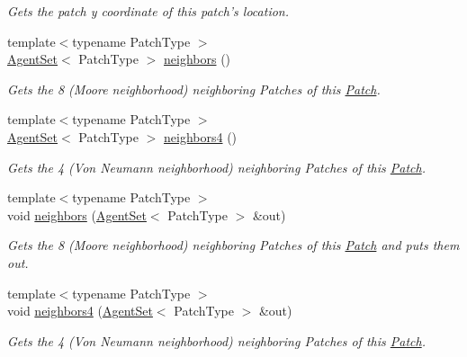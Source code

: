 \begin{DoxyCompactItemize}
\begin{DoxyCompactList}\small\item\em Gets the patch y coordinate of this patch's location. \end{DoxyCompactList}\item 
{\footnotesize template$<$typename Patch\-Type $>$ }\\\hyperlink{classrepast_1_1relogo_1_1_agent_set}{Agent\-Set}$<$ Patch\-Type $>$ \hyperlink{classrepast_1_1relogo_1_1_patch_a932368812cacb950454ceec64bf621e1}{neighbors} ()
\begin{DoxyCompactList}\small\item\em Gets the 8 (Moore neighborhood) neighboring Patches of this \hyperlink{classrepast_1_1relogo_1_1_patch}{Patch}. \end{DoxyCompactList}\item 
{\footnotesize template$<$typename Patch\-Type $>$ }\\\hyperlink{classrepast_1_1relogo_1_1_agent_set}{Agent\-Set}$<$ Patch\-Type $>$ \hyperlink{classrepast_1_1relogo_1_1_patch_a0e372725c27abb4e9b2b6ae61cfc4540}{neighbors4} ()
\begin{DoxyCompactList}\small\item\em Gets the 4 (Von Neumann neighborhood) neighboring Patches of this \hyperlink{classrepast_1_1relogo_1_1_patch}{Patch}. \end{DoxyCompactList}\item 
{\footnotesize template$<$typename Patch\-Type $>$ }\\void \hyperlink{classrepast_1_1relogo_1_1_patch_a23f5d9dbecd26acb74d71bd05c36ce77}{neighbors} (\hyperlink{classrepast_1_1relogo_1_1_agent_set}{Agent\-Set}$<$ Patch\-Type $>$ \&out)
\begin{DoxyCompactList}\small\item\em Gets the 8 (Moore neighborhood) neighboring Patches of this \hyperlink{classrepast_1_1relogo_1_1_patch}{Patch} and puts them out. \end{DoxyCompactList}\item 
{\footnotesize template$<$typename Patch\-Type $>$ }\\void \hyperlink{classrepast_1_1relogo_1_1_patch_aa157e0a9f7028a911a7abde580889511}{neighbors4} (\hyperlink{classrepast_1_1relogo_1_1_agent_set}{Agent\-Set}$<$ Patch\-Type $>$ \&out)
\begin{DoxyCompactList}\small\item\em Gets the 4 (Von Neumann neighborhood) neighboring Patches of this \hyperlink{classrepast_1_1relogo_1_1_patch}{Patch}. \end{DoxyCompactList}\end{DoxyCompactItemize}


